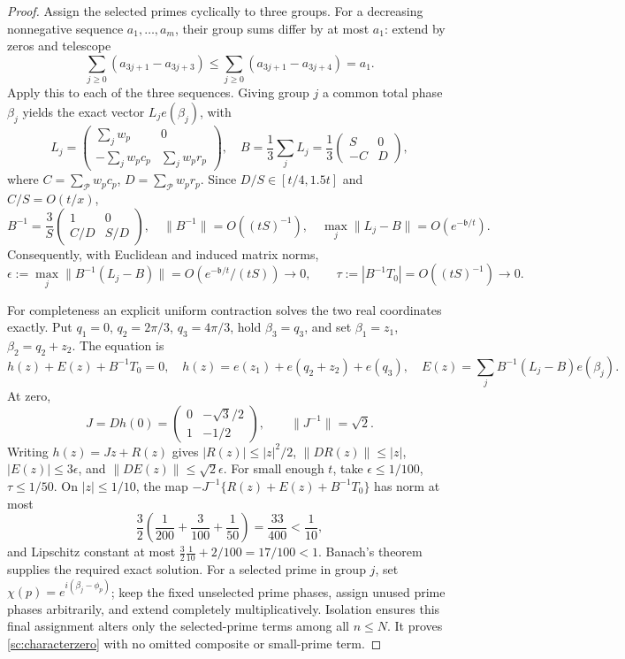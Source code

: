 \documentclass[11pt]{article}
\numberwithin{equation}{section}
\theoremstyle{definition}
\theoremstyle{remark}
\begin{document}
\begin{proof}
Assign the selected primes cyclically to three groups. For a decreasing
nonnegative sequence $a_1,\ldots,a_m$, their group sums differ by at
most $a_1$: extend by zeros and telescope
\[
 \sum_{j\ge0}(a_{3j+1}-a_{3j+3})
 \le\sum_{j\ge0}(a_{3j+1}-a_{3j+4})=a_1.
\]
Apply this to each of the three sequences. Giving group $j$ a common
total phase $\beta_j$ yields the exact vector $L_je(\beta_j)$, with
\[
 L_j=\begin{pmatrix}\sum_jw_p&0\\-\sum_jw_pc_p&\sum_jw_pr_p\end{pmatrix},
 \quad B=\frac13\sum_jL_j=\frac13\begin{pmatrix}S&0\\-C&D\end{pmatrix},
\]
where $C=\sum_{\mathcal P}w_pc_p$, $D=\sum_{\mathcal P}w_pr_p$.
Since $D/S\in[t/4,1.5t]$ and $C/S=O(t/x)$,
\[
 B^{-1}=\frac3S\begin{pmatrix}1&0\\C/D&S/D\end{pmatrix},
 \quad\|B^{-1}\|=O((tS)^{-1}),\quad
 \max_j\|L_j-B\|=O(e^{-\mathfrak b/t}).
\]
Consequently, with Euclidean and induced matrix norms,
\begin{equation}\label{sc:contractionsmallness}
 \epsilon:=\max_j\|B^{-1}(L_j-B)\|
 =O(e^{-\mathfrak b/t}/(tS))\longrightarrow0,
 \qquad\tau:=|B^{-1}T_0|=O((tS)^{-1})\longrightarrow0.
\end{equation}

For completeness an explicit uniform contraction solves the two real
coordinates exactly. Put $q_1=0$, $q_2=2\pi/3$, $q_3=4\pi/3$,
hold $\beta_3=q_3$, and set $\beta_1=z_1$, $\beta_2=q_2+z_2$.
The equation is
\[
 h(z)+E(z)+B^{-1}T_0=0,
 \quad h(z)=e(z_1)+e(q_2+z_2)+e(q_3),
 \quad E(z)=\sum_jB^{-1}(L_j-B)e(\beta_j).
\]
At zero,
\[
 J=Dh(0)=\begin{pmatrix}0&-\sqrt3/2\\1&-1/2\end{pmatrix},
 \qquad\|J^{-1}\|=\sqrt2.
\]
Writing $h(z)=Jz+R(z)$ gives
$|R(z)|\le|z|^2/2$, $\|DR(z)\|\le|z|$,
$|E(z)|\le3\epsilon$, and $\|DE(z)\|\le\sqrt2\epsilon$.
For small enough $t$, take $\epsilon\le1/100$, $\tau\le1/50$.
On $|z|\le1/10$, the map
$-J^{-1}\{R(z)+E(z)+B^{-1}T_0\}$ has norm at most
\[
 \frac32\left(\frac1{200}+\frac3{100}+\frac1{50}\right)
 =\frac{33}{400}<\frac1{10},
\]
and Lipschitz constant at most
$\frac32\frac1{10}+2/100=17/100<1$.
Banach's theorem supplies the required exact solution.
For a selected prime in group $j$, set
$\chi(p)=e^{i(\beta_j-\phi_p)}$; keep the fixed unselected prime phases,
assign unused prime phases arbitrarily, and extend completely
multiplicatively. Isolation ensures this final assignment alters only
the selected-prime terms among all $n\le N$. It proves
\eqref{sc:characterzero} with no omitted composite or small-prime term.
\end{proof}
\end{document}

